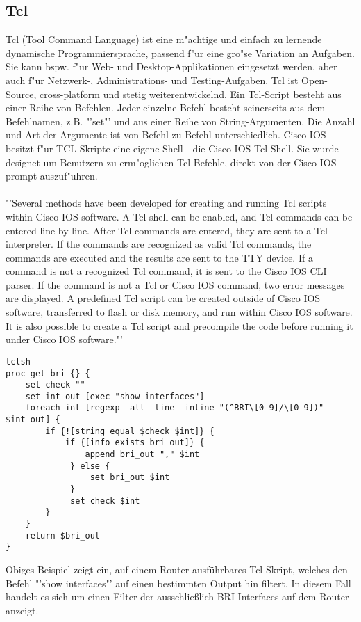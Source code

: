 \documentclass[a4paper,12pt]{scrreprt}
\begin{document}
\subsection{Tcl}
Tcl (Tool Command Language) ist eine m"achtige und einfach zu lernende dynamische Programmiersprache, passend f"ur eine gro"se Variation an Aufgaben. Sie kann bspw. f"ur Web- und Desktop-Applikationen eingesetzt werden, aber auch f"ur Netzwerk-, Administrations- und Testing-Aufgaben. Tcl ist Open-Source, cross-platform und stetig weiterentwickelnd. Ein Tcl-Script besteht aus einer Reihe von Befehlen. Jeder einzelne Befehl besteht seinerseits aus dem Befehlnamen, z.B. "'set"' und aus einer Reihe von String-Argumenten. Die Anzahl und Art der Argumente ist von Befehl zu Befehl unterschiedlich. \cite{tcl1} Cisco IOS besitzt f"ur TCL-Skripte eine eigene Shell - die Cisco IOS Tcl Shell. Sie wurde designet um Benutzern zu erm"oglichen Tcl Befehle, direkt von der Cisco IOS prompt auszuf"uhren. \\\\
"'Several methods have been developed for creating and running Tcl scripts within Cisco IOS software. A Tcl shell can be enabled, and Tcl commands can be entered line by line. After Tcl commands are entered, they are sent to a Tcl interpreter. If the commands are recognized as valid Tcl commands, the commands are executed and the results are sent to the TTY device. If a command is not a recognized Tcl command, it is sent to the Cisco IOS CLI parser. If the command is not a Tcl or Cisco IOS command, two error messages are displayed. A predefined Tcl script can be created outside of Cisco IOS software, transferred to flash or disk memory, and run within Cisco IOS software. It is also possible to create a Tcl script and precompile the code before running it under Cisco IOS software."'\cite{tcl2}
\begin{lstlisting}
tclsh
proc get_bri {} {
    set check ""
    set int_out [exec "show interfaces"]
    foreach int [regexp -all -line -inline "(^BRI\[0-9]/\[0-9])" $int_out] {
        if {![string equal $check $int]} {
            if {[info exists bri_out]} {
                append bri_out "," $int
             } else {
                 set bri_out $int
             }
             set check $int
        }
    }
    return $bri_out
}
\end{lstlisting}
Obiges Beispiel zeigt ein, auf einem Router ausführbares Tcl-Skript, welches den Befehl "'show interfaces"' auf einen bestimmten Output hin filtert. In diesem Fall handelt es sich um einen Filter der ausschließlich BRI Interfaces auf dem Router anzeigt.
\end{document}

